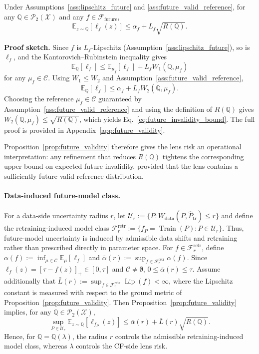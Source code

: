 \begin{proposition}
\label{prop:future_validity}
Under Assumptions~\ref{ass:lipschitz_future} and
\ref{ass:future_valid_reference}, for any
$\mathbb{Q}\in\mathcal{P}_2(\mathcal{X})$ and any
$f\in\mathcal{F}_{\mathrm{future}}$,
\begin{equation}
    \mathbb{E}_{z\sim\mathbb{Q}}
    \left[
        \ell_f(z)
    \right]
    \leq
    \alpha_f
    +
    L_f\sqrt{R(\mathbb{Q})}.
    \label{eq:future_invalidity_bound}
\end{equation}
\end{proposition}

\textbf{Proof sketch.}
Since $f$ is $L_f$-Lipschitz
(Assumption~\ref{ass:lipschitz_future}), so is $\ell_f$, and the
Kantorovich--Rubinstein inequality gives
\[
    \mathbb{E}_{\mathbb{Q}}[\ell_f]
    \leq
    \mathbb{E}_{\mu_f}[\ell_f]
    +
    L_f W_1(\mathbb{Q},\mu_f)
\]
for any $\mu_f\in\mathcal{C}$.
Using $W_1\leq W_2$ and
Assumption~\ref{ass:future_valid_reference},
\[
    \mathbb{E}_{\mathbb{Q}}[\ell_f]
    \leq
    \alpha_f
    +
    L_f W_2(\mathbb{Q},\mu_f).
\]
Choosing the reference $\mu_f\in\mathcal{C}$ guaranteed by
Assumption~\ref{ass:future_valid_reference} and using the definition of
$R(\mathbb{Q})$ gives
$W_2(\mathbb{Q},\mu_f)\leq\sqrt{R(\mathbb{Q})}$, which yields
Eq.~\ref{eq:future_invalidity_bound}.
The full proof is provided in Appendix~\ref{app:future_validity}.

Proposition~\ref{prop:future_validity} therefore gives the lens risk an
operational interpretation: any refinement that reduces
$R(\mathbb{Q})$ tightens the corresponding upper bound on expected future
invalidity, provided that the lens contains a sufficiently future-valid
reference distribution.

\paragraph{Data-induced future-model class.}
For a data-side uncertainty radius $r$, let
$\mathcal U_r:=\{P:W_{\mathrm{data}}(P,\widehat P_{\mathrm{tr}})\le r\}$
and define the retraining-induced model class
$\mathcal F_r^{\mathrm{retr}}
:=\{f_P=\operatorname{Train}(P):P\in\mathcal U_r\}$.
Thus, future-model uncertainty is induced by admissible data shifts and retraining rather than prescribed directly in parameter space. For
$f\in\mathcal F_r^{\mathrm{retr}}$, define
$\alpha(f):=\inf_{\mu\in\mathcal C}\mathbb E_{\mu}[\ell_f]$ and
$\bar\alpha(r):=\sup_{f\in\mathcal F_r^{\mathrm{retr}}}\alpha(f)$.
Since $\ell_f(z)=[\tau-f(z)]_+\in[0,\tau]$ and $\mathcal C\neq\emptyset$,
$0\le\bar\alpha(r)\le\tau$.
Assume additionally that
$\bar L(r):=\sup_{f\in\mathcal F_r^{\mathrm{retr}}}\operatorname{Lip}(f)<\infty$,
where the Lipschitz constant is measured with respect to the ground metric of Proposition~\ref{prop:future_validity}. Then Proposition~\ref{prop:future_validity} implies, for any $\mathbb Q\in\mathcal P_2(\mathcal X)$,
\[
\sup_{P\in\mathcal U_r}
\mathbb E_{z\sim\mathbb Q}[\ell_{f_P}(z)]
\le
\bar\alpha(r)+\bar L(r)\sqrt{R(\mathbb Q)}.
\]
Hence, for $\mathbb Q=\mathbb Q(\lambda)$, the radius $r$ controls the admissible retraining-induced model class, whereas $\lambda$ controls the CF-side lens risk. 
\fi
